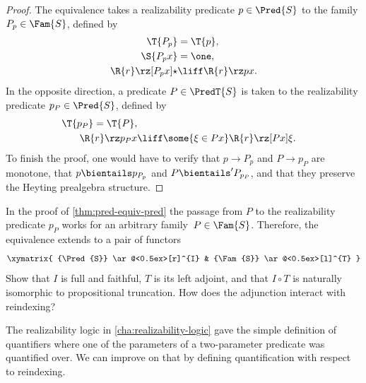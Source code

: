 \begin{proof}
  The equivalence takes a realizability predicate $p \in \Pred{S}$ to the family
  $P_p \in \Fam{S}$, defined by
  \begin{align*}
    \T{P_p} &= \T{p}, \\
    \S{P_p x} &= \one, \\
    \R{r} \rz[P_p x] \star &\liff \R{r} \rz p x.
  \end{align*}
  In the opposite direction, a predicate $P \in \PredT{S}$ is taken to the realizability predicate $p_P \in \Pred{S}$, defined by
  \begin{align*}
    \T{p_P} = \T{P}, \\
    \R{r} \rz p_P x &\liff \some{\xi \in P x} \R{r} \rz[P x] \xi.
  \end{align*}
  To finish the proof, one would have to verify that $p \to P_p$ and $P \to p_P$ are monotone, that $p \bientails p_{P_p}$ and $P \bientails' P_{p_P}$, and that they preserve the Heyting prealgebra structure.
\end{proof}

\begin{exercise}
  In the proof of \cref{thm:pred-equiv-pred} the passage from $P$ to the realizability predicate $p_P$ works for an arbitrary family~$P \in \Fam{S}$. Therefore, the equivalence extends to a pair of functors
  \begin{equation*}
    \xymatrix{
      {\Pred{S}}
      \ar@<0.5ex>[r]^{I}
      &
      {\Fam{S}}
      \ar@<0.5ex>[l]^{T}
    }
  \end{equation*}
  Show that $I$ is full and faithful, $T$ is its left adjoint, and that $I \circ T$ is naturally isomorphic to propositional truncation. How does the adjunction interact with reindexing?
\end{exercise}

The realizability logic in \cref{cha:realizability-logic} gave the simple definition of quantifiers where one of the parameters of a two-parameter predicate was quantified over. We can improve on that by defining quantification with respect to reindexing.

